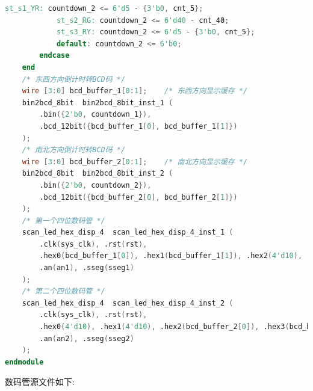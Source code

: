 \documentclass{article}
\begin{document}
\begin{lstlisting}[language=Verilog, caption={交通灯控制基础任务源文件}]
            st_s1_YR: countdown_2 <= 6'd5 - {3'b0, cnt_5};
            st_s2_RG: countdown_2 <= 6'd40 - cnt_40;
            st_s3_RY: countdown_2 <= 6'd5 - {3'b0, cnt_5};
            default: countdown_2 <= 6'b0;
        endcase
    end
    /* 东西方向倒计时转BCD码 */
    wire [3:0] bcd_buffer_1[0:1];    /* 东西方向显示缓存 */
    bin2bcd_8bit  bin2bcd_8bit_inst_1 (
        .bin({2'b0, countdown_1}),
        .bcd_12bit({bcd_buffer_1[0], bcd_buffer_1[1]})
    );
    /* 南北方向倒计时转BCD码 */
    wire [3:0] bcd_buffer_2[0:1];    /* 南北方向显示缓存 */
    bin2bcd_8bit  bin2bcd_8bit_inst_2 (
        .bin({2'b0, countdown_2}),
        .bcd_12bit({bcd_buffer_2[0], bcd_buffer_2[1]})
    );
    /* 第一个四位数码管 */
    scan_led_hex_disp_4  scan_led_hex_disp_4_inst_1 (
        .clk(sys_clk), .rst(rst),
        .hex0(bcd_buffer_1[0]), .hex1(bcd_buffer_1[1]), .hex2(4'd10), .hex3(4'd10), .dp(4'b0000),
        .an(an1), .sseg(sseg1)
    );
    /* 第二个四位数码管 */
    scan_led_hex_disp_4  scan_led_hex_disp_4_inst_2 (
        .clk(sys_clk), .rst(rst),
        .hex0(4'd10), .hex1(4'd10), .hex2(bcd_buffer_2[0]), .hex3(bcd_buffer_2[1]), .dp(4'b0000),
        .an(an2), .sseg(sseg2)
    );
endmodule    
\end{lstlisting}
数码管源文件如下:
\end{document}
